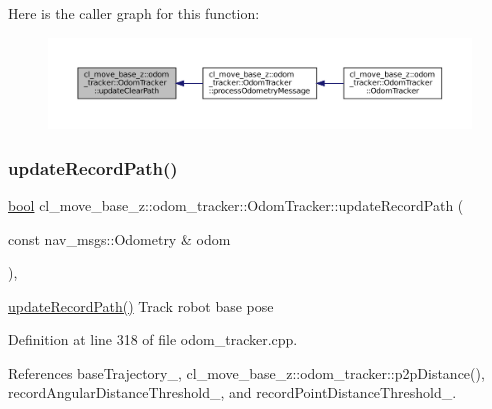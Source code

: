 Here is the caller graph for this function\+:
\nopagebreak
\begin{figure}[H]
\begin{center}
\leavevmode
\includegraphics[width=350pt]{classcl__move__base__z_1_1odom__tracker_1_1OdomTracker_abe7ba4dbf014e1f2c64b5806ce42c073_icgraph}
\end{center}
\end{figure}
\mbox{\label{classcl__move__base__z_1_1odom__tracker_1_1OdomTracker_a77a66083573c6bef726d77447fb53349}} 
\subsubsection{\texorpdfstring{update\+Record\+Path()}{updateRecordPath()}}
{\footnotesize\ttfamily \hyperlink{classbool}{bool} cl\+\_\+move\+\_\+base\+\_\+z\+::odom\+\_\+tracker\+::\+Odom\+Tracker\+::update\+Record\+Path (\begin{DoxyParamCaption}\item[{const nav\+\_\+msgs\+::\+Odometry \&}]{odom }\end{DoxyParamCaption})\hspace{0.3cm}{\ttfamily [protected]}, {\ttfamily [virtual]}}

\hyperlink{classcl__move__base__z_1_1odom__tracker_1_1OdomTracker_a77a66083573c6bef726d77447fb53349}{update\+Record\+Path()} Track robot base pose 

Definition at line 318 of file odom\+\_\+tracker.\+cpp.



References base\+Trajectory\+\_\+, cl\+\_\+move\+\_\+base\+\_\+z\+::odom\+\_\+tracker\+::p2p\+Distance(), record\+Angular\+Distance\+Threshold\+\_\+, and record\+Point\+Distance\+Threshold\+\_\+.



